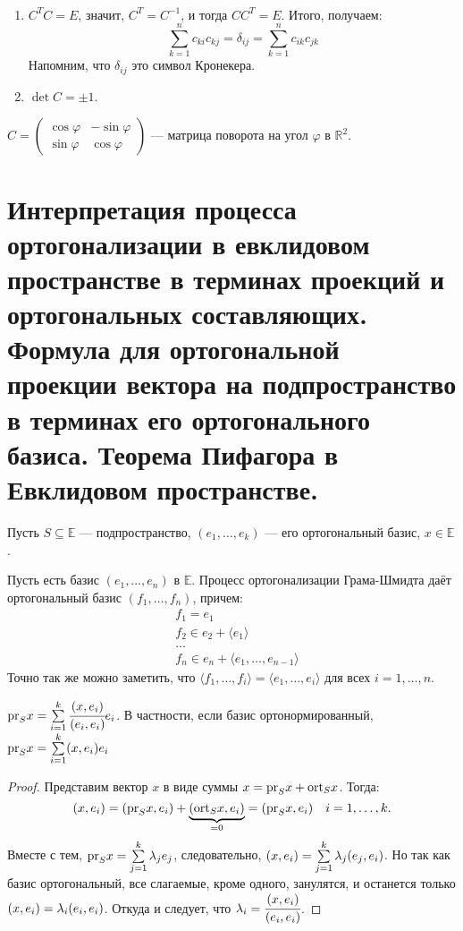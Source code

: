 \begin{Properties}\
\begin{enumerate}
\item $C^TC = E$, значит, $C^T = C^{-1}$, и тогда $CC^T = E$. Итого, получаем:
$$
\sum\limits_{k = 1}^{n}c_{ki}c_{kj} = \delta_{ij} = \sum\limits_{k = 1}^{n}c_{ik}c_{jk}
$$
Напомним, что $\delta_{ij}$ это символ Кронекера.
\item $\det C = \pm 1$.
\end{enumerate}
\end{Properties}

\begin{Examples}
	$C = \begin{pmatrix}
	\cos \varphi& -\sin \varphi\\
	\sin \varphi& \cos \varphi
	\end{pmatrix}$ --- матрица поворота на угол $\varphi$ в $\mathbb{R}^2$.
\end{Examples}

\section{Интерпретация процесса ортогонализации в евклидовом пространстве в терминах проекций и ортогональных составляющих. Формула для ортогональной проекции вектора на подпространство в терминах его ортогонального базиса. Теорема Пифагора в Евклидовом пространстве.}

Пусть $S \subseteq \mathbb{E}$ --- подпространство, $(e_1, \ldots, e_k)$ --- его ортогональный базис, $x \in \mathbb{E}$.

Пусть есть базис $(e_1, \ldots, e_n)$ в $\mathbb{E}$. Процесс ортогонализации Грама-Шмидта даёт ортогональный базис $(f_1, \ldots, f_n)$, причем:
\begin{align*}
	& f_1 = e_1\\
	& f_2 \in e_2 + \langle e_1 \rangle\\
	& \ldots\\
	& f_n  \in e_n + \langle e_1, \ldots, e_{n - 1} \rangle
\end{align*}
Точно так же можно заметить, что $\langle f_1, \ldots, f_i \rangle = \langle e_1, \ldots, e_i\rangle$ для всех $i= 1, \ldots, n$.

\begin{Suggestion}
	$\mathrm{pr}_S x = \sum\limits_{i = 1}^{k}\cfrac{(x,e_i)}{(e_i, e_i)}e_i$. В частности, если базис ортонормированный, \\$\mathrm{pr}_S x = \sum\limits_{i = 1}^{k}(x,e_i)e_i$
\end{Suggestion}
\begin{proof}
Представим вектор $x$ в виде суммы $x = \mathrm{pr}_Sx + \mathrm{ort}_Sx$. Тогда:
$$
(x, e_i) = (\mathrm{pr}_S x, e_i) + \underbrace{(\mathrm{ort}_S x, e_i)}_{=0} = (\mathrm{pr}_S x, e_i) \quad i = 1, \ldots, k.
$$
Вместе с тем, $\mathrm{pr}_S x = \sum\limits_{j = 1}^{k}\lambda_je_j$, следовательно, $(x, e_i) = \sum\limits_{j = 1}^k\lambda_j(e_j, e_i)$.
Но так как базис ортогональный, все слагаемые, кроме одного, занулятся, и останется только $(x, e_i) = \lambda_i(e_i, e_i)$. Откуда и следует, что $\lambda_i = \cfrac{(x, e_i)}{(e_i, e_i)}$.
\end{proof}

